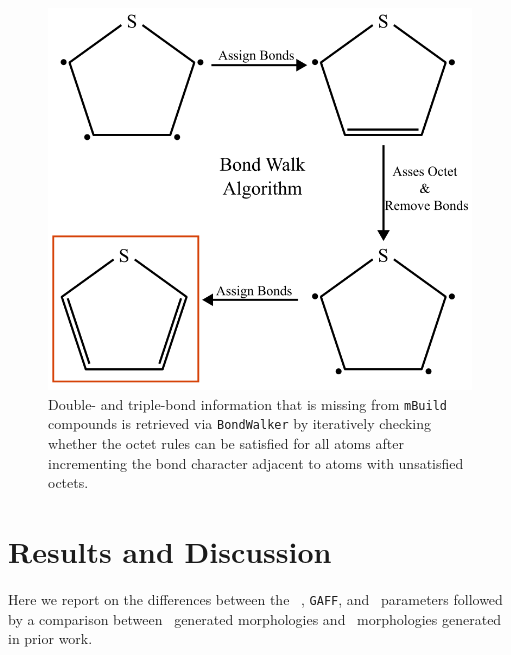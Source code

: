 \begin{figure}
    \centering
    \includegraphics[width=0.5\linewidth]{src/figures/FF_figs/bondwalk_algorithm.png}
    \caption{Double- and triple-bond information that is missing from \texttt{mBuild} compounds is retrieved via \texttt{BondWalker} by iteratively checking whether the octet rules can be satisfied for all atoms after incrementing the bond character adjacent to atoms with unsatisfied octets.
}
    \label{bond_walk}
\end{figure}


\section{Results and Discussion}
Here we report on the differences between the \espff~, \texttt{GAFF}, and \oplsff~parameters followed by a comparison between \espff~generated morphologies and \oplsff~morphologies generated in prior work.

